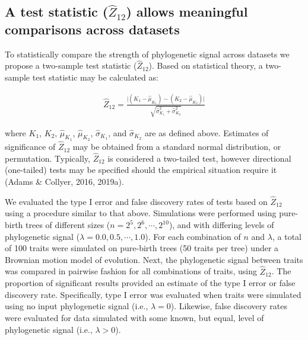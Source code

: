 \documentclass[
]{article}
\begin{document}
\hypertarget{a-test-statistic-hatz_12-allows-meaningful-comparisons-across-datasets}{%
\subsection{\texorpdfstring{A test statistic (\(\hat{Z}_{12}\)) allows
meaningful comparisons across
datasets}{A test statistic (\textbackslash hat\{Z\}\_\{12\}) allows meaningful comparisons across datasets}}\label{a-test-statistic-hatz_12-allows-meaningful-comparisons-across-datasets}}

To statistically compare the strength of phylogenetic signal across
datasets we propose a two-sample test statistic (\(\hat{Z}_{12}\)).
Based on statistical theory, a two-sample test statistic may be
calculated as:

\begin{align}
  \hat{Z}_{12}=\frac{\lvert{(K_{1}-\hat\mu_{K_1})-(K_{2}-\hat\mu_{K_2})}\rvert}{\sqrt{\hat\sigma^2_{K_1}+\hat\sigma^2_{K_2}}} 
\end{align}

where \(K_1\), \(K_2\), \(\hat\mu_{K_1}\), \(\hat\mu_{K_2}\),
\(\hat\sigma_{K_1}\), and \(\hat\sigma_{K_2}\) are as defined above.
Estimates of significance of \(\hat{Z}_{12}\) may be obtained from a
standard normal distribution, or permutation. Typically,
\(\hat{Z}_{12}\) is considered a two-tailed test, however directional
(one-tailed) tests may be specified should the empirical situation
require it (Adams \& Collyer, 2016, 2019a). \hfill\break

We evaluated the type I error and false discovery rates of tests based
on \(\hat{Z}_{12}\) using a procedure similar to that above. Simulations
were performed using pure-birth trees of different sizes
(\(n=2^5, 2^6, \cdots, 2^{10}\)), and with differing levels of
phylogenetic signal (\(\lambda=0.0, 0.5, \cdots, 1.0\)). For each
combination of \(n\) and \(\lambda\), a total of 100 traits were
simulated on pure-birth trees (50 traits per tree) under a Brownian
motion model of evolution. Next, the phylogenetic signal between traits
was compared in pairwise fashion for all combinations of traits, using
\(\hat{Z}_{12}\). The proportion of significant results provided an
estimate of the type I error or false discovery rate. Specifically, type
I error was evaluated when traits were simulated using no input
phylogenetic signal (i.e., \(\lambda = 0\)). Likewise, false discovery
rates were evaluated for data simulated with some known, but equal,
level of phylogenetic signal (i.e., \(\lambda > 0\)). \hfill\break
\end{document}

